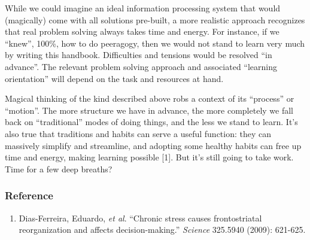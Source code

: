 
While we could imagine an ideal information processing system that would
(magically) come with all solutions pre-built, a more realistic approach
recognizes that real problem solving always takes time and energy. For
instance, if we ``knew'', 100\%, how to do peeragogy, then we would not
stand to learn very much by writing this handbook. Difficulties and
tensions would be resolved ``in advance''. The relevant problem solving
approach and associated ``learning orientation'' will depend on the task
and resources at hand.


Magical thinking of the kind described above robs a context of its
``process'' or ``motion''. The more structure we have in advance, the
more completely we fall back on ``traditional'' modes of doing things,
and the less we stand to learn. It's also true that traditions and
habits can serve a useful function: they can massively simplify and
streamline, and adopting some healthy habits can free up time and
energy, making learning possible {[}1{]}. But it's still going to take
work. Time for a few deep breaths?

\subsubsection{Reference}

\begin{enumerate}
\item
  Dias-Ferreira, Eduardo, \emph{et al}. ``Chronic stress causes
  frontostriatal reorganization and affects decision-making.''
  \emph{Science} 325.5940 (2009): 621-625.
\end{enumerate}
